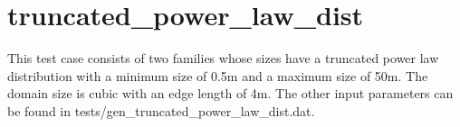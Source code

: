 \documentclass[letterpaper,10pt,english]{sphinxmanual}
\begin{document}
\begin{DUlineblock}{0em}
\item[] 
\item[] 
\end{DUlineblock}


\section{truncated\_power\_law\_dist}
\label{examples:truncated-power-law-dist}
This test case consists of two families whose sizes have a truncated power law distribution with a minimum size of 0.5m and a maximum size of 50m. The domain size is cubic with an edge length of 4m. The other input parameters can be found in tests/gen\_truncated\_power\_law\_dist.dat.

{\hfill{}\hfill}

\begin{DUlineblock}{0em}
\item[] 
\item[] 
\end{DUlineblock}

{\hfill{}\hfill}

\begin{DUlineblock}{0em}
\item[] 
\item[] 
\end{DUlineblock}
\end{document}
